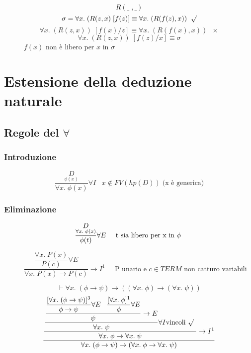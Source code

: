 \documentclass{article}
\theoremstyle{break}
\theoremstyle{break}
\theoremstyle{break}
\theoremstyle{break}
\begin{document}
\begin{figure}[H]
  \begin{example}
    \[
    R(\_\;,\_)
    \] 
    \[
      \sigma=\forall x.\;(R(z,x)\;[f(z)] \equiv \forall x.\; (R(f(z),x)) \;\;\surd
    \] 
    \[
      \forall x.\; (R(z,x))\;[f(x)/z] \equiv \forall x.\; (R(f(x),x)) \;\;\times
    \] 
    \[
      \forall x.\; (R(z,x))\;[f(z)/x] \equiv \sigma
    \] 
    \( f(x) \) non è libero per \( x \) in \( \sigma \)
  \end{example}
\end{figure}

\section{Estensione della deduzione naturale}
\subsection{Regole del \( \forall  \)}
\subsubsection{Introduzione}
    \large\[
      \frac{\underset{\phi(x)}{D}}{\forall x.\; \phi(x)}\forall I \;\;\; x \notin FV(hp(D))\; \text{(x è generica)}
    \]
\subsubsection{Eliminazione}
  \large\[
    \frac{\underset{\forall x.\; \phi(x)}{D}}{\phi(t)} \forall E \;\;\;\;\; \text{t sia libero per x in \( \phi \) }
  \] 
  \begin{figure}[H]
    \begin{exercise}
      \[
        \dfrac{\dfrac{\forall x.\; P(x)}{P(c)}\forall E}{\forall x.\; P(x) \to P(c)} \to I^1 \;\;\;\;\; \text{P unario e \(c \in TERM \) non catturo variabili }
      \] 
    \end{exercise}
  \end{figure}

  \begin{figure}[H]
    \begin{exercise}
      \[
        \vdash \forall x.\; (\phi \to \psi) \to ((\forall x.\; \phi) \to (\forall x.\; \psi))
      \] 
      \[
        \dfrac{\dfrac{\dfrac{\dfrac{\dfrac{[\forall x.\; (\phi \to \psi)]^3}{\phi \to \psi} \forall E \;\;\;\dfrac{[\forall x.\;\phi]^1}{\phi} \forall E}{\psi} \to E}{\forall x.\;\psi}\forall I \text{vincoli \( \surd \) }}{\forall x.\;\phi \to \forall x.\; \psi} \to I^1}{\forall x.\;(\phi \to \psi) \to (\forall x.\;  \phi \to  \forall x.\; \psi)}
      \] 
    \end{exercise}
    \end{figure}
\end{document}
